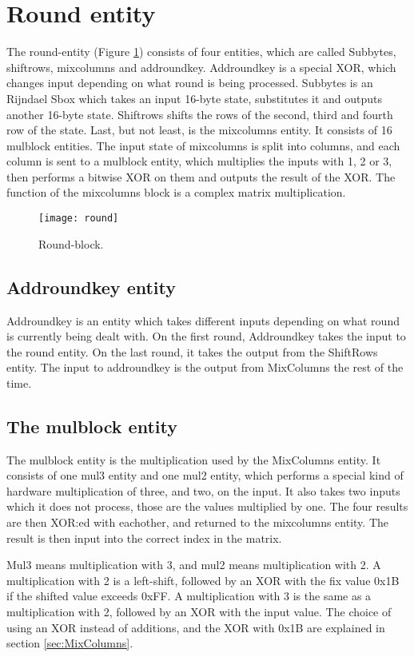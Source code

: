 \section{Round entity}
The round-entity (Figure \ref{block:round}) consists of four entities, 
which are called Subbytes, shiftrows, mixcolumns and addroundkey. 
Addroundkey is a special XOR, which changes input depending on what 
round is being processed. Subbytes is an Rijndael Sbox which takes an 
input 16-byte state, substitutes it and outputs another 16-byte state. 
Shiftrows shifts the rows of the second, third and fourth row of 
the state. Last, but not least, is the mixcolumns entity. It consists 
of 16 mulblock entities. The input state of mixcolumns is split into 
columns, and each column is sent to a mulblock entity, which 
multiplies the inputs with 1, 2 or 3, then performs a bitwise XOR on 
them and outputs the result of the XOR. The function of the mixcolumns 
block is a complex matrix multiplication.

\begin{figure}[h!]
  \centering
  \texttt{[image: round]}
  \caption{Round-block.}
  \label{block:round}
\end{figure}

\subsection{Addroundkey entity}
Addroundkey is an entity which takes different inputs depending on 
what round is currently being dealt with. On the first round, 
Addroundkey takes the input to the round entity. On the last round, it 
takes the output from the ShiftRows entity. The input to addroundkey 
is the output from MixColumns the rest of the time.

\subsection{The mulblock entity}
The mulblock entity is the multiplication used by the MixColumns 
entity. It consists of one mul3 entity and one mul2 entity, which 
performs a special kind of hardware multiplication of three, and two, 
on the input. It also takes two inputs which it does not process, 
those are the values multiplied by one. The four results are then 
XOR:ed with eachother, and returned to the mixcolumns entity. The 
result is then input into the correct index in the matrix.

Mul3 means multiplication with 3, and mul2 means multiplication with 
2. A multiplication with 2 is a left-shift, followed by an XOR with 
the fix value 0x1B if the shifted value exceeds 0xFF. A multiplication 
with 3 is the same as a multiplication with 2, followed by an XOR with 
the input value. The choice of using an XOR instead of additions, and 
the XOR with 0x1B are explained in section \ref{sec:MixColumns}.

